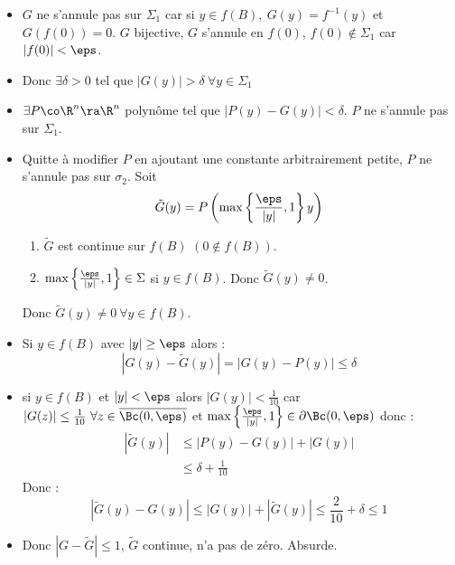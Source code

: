 \begin{itemize}
  \item $G$ ne s'annule pas sur $\Sigma_1$ car si $y\in f(B),\ G(y)=f^{-1}(y)$ et $G(f(0))=0$. $G$ bijective, $G$ s'annule en $f(0)$, $f(0)\notin\Sigma_1$ car $|f(0)|<\eps$.
  \item Donc $\exists\delta>0$ tel que $|G(y)|>\delta\ \forall y\in\Sigma_1$
  \item $\exists P\co\R^n\ra\R^n$ polynôme tel que $|P(y)-G(y)|<\delta$. $P$ ne s'annule pas sur $\Sigma_1$.
  \item Quitte à modifier $P$ en ajoutant une constante arbitrairement petite, $P$ ne s'annule pas sur $\sigma_2$.
    Soit $$\tilde G(y)=P\left(\max\left\{\frac{\eps}{|y|},1\right\}y\right)$$
    \begin{enumerate}
      \item $\tilde G$ est continue sur $f(B)$ $(0\notin f(B))$.
      \item $\max\left\{\frac{\eps}{|y|},1\right\}\in\Sigma$ si $y\in f(B)$. Donc $\tilde G(y)\neq 0$.
    \end{enumerate}
    Donc $\tilde G(y)\neq 0\ \forall y\in f(B)$.
  \item Si $y\in f(B)$ avec $|y|\ge\eps$ alors :
    $$|G(y)-\tilde G(y)|=|G(y)-P(y)|\le\delta$$
  \item si $y\in f(B)$ et $|y|<\eps$ alors $|G(y)|<\frac{1}{10}$ car $|G(z)|\le\frac{1}{10}\ \forall z\in\overline{\Bc(0,\eps)}$ et $\max\left\{\frac{\eps}{|y|},1\right\}\in\partial\Bc(0,\eps)$ donc :
    \begin{align*}
      |\tilde G(y)|&\le|P(y)-G(y)|+|G(y)|\\
              &\le\delta+\frac{1}{10}
    \end{align*}
    Donc :
    $$|\tilde G(y)-G(y)|\le|G(y)|+|\tilde G(y)|\le\frac{2}{10}+\delta\le 1$$
  \item Donc $|G-\tilde G|\le 1$, $\tilde G$ continue, n'a pas de zéro. Absurde.
\end{itemize}
\prvf


